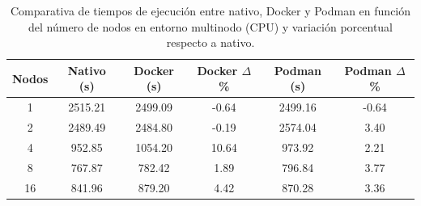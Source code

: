 \begin{table}[ht]
    \centering
    \begin{tabular}{|c|c|c|c|c|c|}
        \hline
        \textbf{Nodos} & \textbf{Nativo (s)} & \textbf{Docker (s)} & \textbf{Docker $\Delta$\%} & \textbf{Podman (s)} & \textbf{Podman $\Delta$\%} \\
        \hline
        1              & 2515.21             & 2499.09             & -0.64                      & 2499.16             & -0.64                      \\
        2              & 2489.49             & 2484.80             & -0.19                      & 2574.04             & 3.40                       \\
        4              & 952.85              & 1054.20             & 10.64                      & 973.92              & 2.21                       \\
        8              & 767.87              & 782.42              & 1.89                       & 796.84              & 3.77                       \\
        16             & 841.96              & 879.20              & 4.42                       & 870.28              & 3.36                       \\
        \hline
    \end{tabular}
    \caption{Comparativa de tiempos de ejecución entre nativo, Docker y Podman en función del número de nodos en entorno multinodo (CPU) y variación porcentual respecto a nativo.}
    \label{tab:multi-node_ubuntu_container_vs_native}
\end{table}

